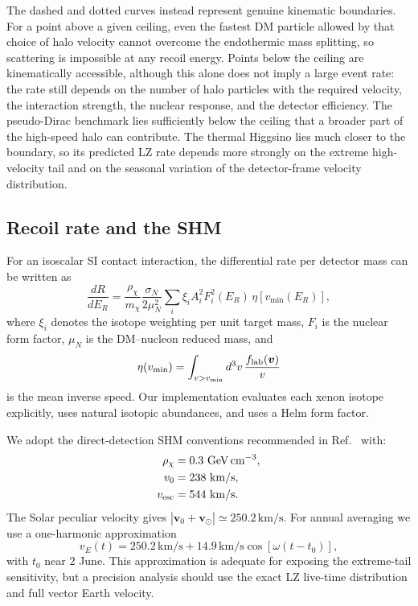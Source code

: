 \documentclass[aps,prd,reprint,superscriptaddress,nofootinbib,longbibliography,floatfix]{revtex4-2}
\newcommand{\sigman}{\sigma_{N}}
\newcommand{\vmin}{v_{\min}}
\newcommand{\mchi}{m_{\chi}}
\newcommand{\er}{E_{R}}
\newcommand{\GeV}{\mathrm{GeV}}
\begin{document}
The dashed and dotted curves instead represent genuine kinematic boundaries. For a point above a given ceiling, even the fastest DM particle allowed by that choice of halo velocity cannot overcome the endothermic mass splitting, so scattering is impossible at any recoil energy. Points below the ceiling are kinematically accessible, although this alone does not imply a large event rate: the rate still depends on the number of halo particles with the required velocity, the interaction strength, the nuclear response, and the detector efficiency. The pseudo-Dirac benchmark lies sufficiently below the ceiling that a broader part of the high-speed halo can contribute. The thermal Higgsino lies much closer to the boundary, so its predicted LZ rate depends more strongly on the extreme high-velocity tail and on the seasonal variation of the detector-frame velocity distribution.



\subsection{Recoil rate and the SHM}

For an isoscalar SI contact interaction, the differential rate per detector mass can be written as \cite{LewinSmith1996,Baxter2021}
\begin{equation}
\frac{dR}{d\er}
=\frac{\rho_\chi}{\mchi}\frac{\sigman}{2\mu_N^2}
\sum_i \xi_i A_i^2 F_i^2(\er)\,\eta\!\left[\vmin(\er)\right],
\label{eq:ratecompact}
\end{equation}
where $\xi_i$ denotes the isotope weighting per unit target mass, $F_i$ is the nuclear form factor, $\mu_N$ is the DM--nucleon reduced mass, and
\begin{equation}
\eta(v_{\min})=\int_{v>v_{\min}}d^3v\,\frac{f_{\rm lab}(\bm{v})}{v}
\end{equation}
is the mean inverse speed. Our implementation evaluates each xenon isotope explicitly, uses natural isotopic abundances, and uses a Helm form factor.

We adopt the direct-detection SHM conventions recommended in Ref.~\cite{Baxter2021} with:
\begin{align}
\rho_\chi &= 0.3\ \GeV\,\mathrm{cm}^{-3},\\
v_0 &= 238\ \mathrm{km/s},\\
v_{\rm esc} &= 544\ \mathrm{km/s}.
\end{align}
The Solar peculiar velocity gives $|\bm v_0+\bm v_\odot|\simeq250.2\,\mathrm{km/s}$. For annual averaging we use a one-harmonic approximation
\begin{equation}
v_E(t)=250.2\,\mathrm{km/s}+14.9\,\mathrm{km/s}\cos\!\left[\omega(t-t_0)\right],
\end{equation}
with $t_0$ near 2 June. This approximation is adequate for exposing the extreme-tail sensitivity, but a precision analysis should use the exact LZ live-time distribution and full vector Earth velocity.
\end{document}
